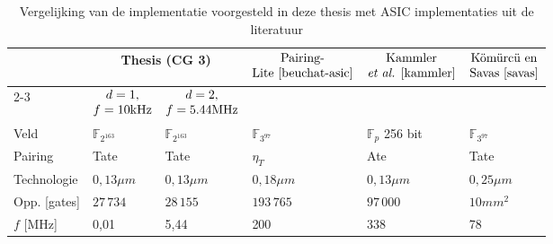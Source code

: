 \begin{table}[h]
	\caption{Vergelijking van de implementatie voorgesteld in deze thesis met ASIC implementaties uit de literatuur}
	\label{tabel-resultaten-asic}

	\begin{narrow}{-2cm}{-2cm}
		\centering
		\begin{tabular}{llllll}
			\toprule
			&	\multicolumn{2}{c}{Thesis (CG 3)\footnotemark[2]}	& \multirow{3}{*}{$\begin{array}{@{}c@{}}\text{Pairing-}\\\text{Lite \cite{beuchat-asic}}\end{array}$}	& \multicolumn{1}{c}{\multirow{3}{*}{$\begin{array}{@{}c@{}}\text{Kammler}\\\text{\emph{et al.} \cite{kammler}}\end{array}$}}	&  \multicolumn{1}{c}{\multirow{3}{*}{$\begin{array}{@{}c@{}}\text{K\"om\"urc\"u en}\\\text{Savas \cite{savas}}\end{array}$}}\\
			\cmidrule(r){2-3}
			& \multicolumn{1}{c}{$\begin{array}{@{}c@{}}d = 1,\\f = 10\text{kHz}\end{array}$} & \multicolumn{1}{c}{$\begin{array}{@{}c@{}}d = 2,\\f = 5.44\text{MHz}\end{array}$} & & &\\
	 		\midrule
			Veld																				& $\mathbb{F}_{2^{163}}$	& $\mathbb{F}_{2^{163}}$	& $\mathbb{F}_{3^{97}}$	& $\mathbb{F}_{p}$ 256 bit	& $\mathbb{F}_{3^{97}}$ \\
			Pairing																			& Tate							& Tate							& $\eta_T$					& Ate			 					& Tate\\
			Technologie																		& $0,13 \mu m$					& $0,13 \mu m$					& $0,18 \mu m$				& $0,13 \mu m$					& $0,25 \mu m$\\
			Opp. [gates]																	& $27\,734$						& $28\,155$						& $193\,765$				& $97\,000$						& \emph{$10mm^2$}\footnotemark[3]\\
			$f$ [MHz]																		& 0,01							& 5,44							& 200							& 338								& 78\\

\end{tabular}
\end{narrow}
\end{table}
